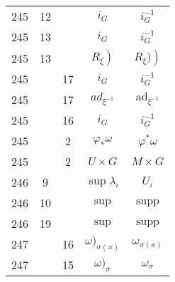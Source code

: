 \documentclass[a4paper,11pt]{article}
\newcommand{\mr}{\mathrm}
\newcommand{\ti}{\times}
\newcommand{\ad}{\mr{ad}}
\newcommand{\supp}{\mr{supp}}
\newcommand{\vp}{\varphi}
\newcommand{\io}{\iota}
\newcommand{\la}{\lambda}
\newcommand{\om}{\omega}
\newcommand{\s}{\sigma}
\begin{document}
\begin{center}
\begin{tabular}{|c|c|c|c|c|}
    245 & 12 & & $i_{ G }$ & $i_{ G }^{ -1 }$ \\
    245 & 13 & & $i_{ G }$ & $i_{ G }^{ -1 }$ \\
    245 & 13 & & $\left. R_{ \xi } \right)$ & $\left. R_{ \xi } ) \right)$ \\
    245 & & 17 & $i_{ G }$ & $i_{ G }^{ -1 }$ \\
    245 & & 17 & $ad_{ \xi^{ -1 } }$ & $\ad_{ \xi^{ -1 } }$ \\
    245 & & 16 & $i_{ G }$ & $i_{ G }^{ -1 }$ \\
    245 & &  2 & $\vp_{ * } \om$ & $\vp^{ * } \om$ \\
    245 & &  2 & $U \ti G$ & $M \ti G$ \\
    246 &  9 & & $\sup \la_{ \io }$ & $U_{ \io }$ \\
    246 & 10 & & $\sup$ & $\supp$ \\
    246 & 19 & & $\sup$ & $\supp$ \\
    247 & & 16 & $\om )_{ \s( x ) }$ & $\om_{ \s( x ) }$ \\
    247 & & 15 & $\om )_{ \s }$ & $\om_{ \s }$ \\
    \hline
  \end{tabular}


\end{center}
\end{document}
